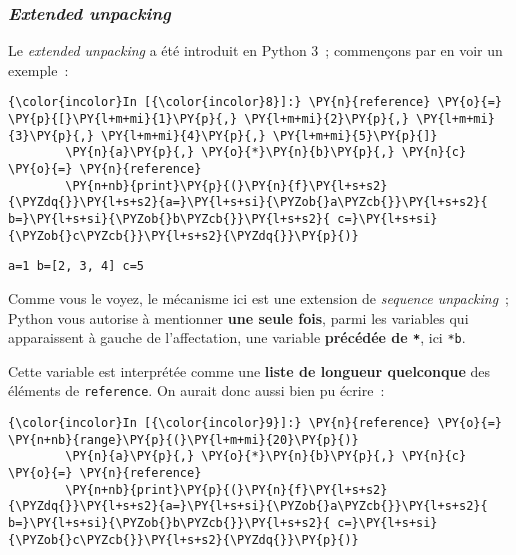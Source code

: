     \hypertarget{extended-unpacking}{%
\subsubsection{\texorpdfstring{\emph{Extended
unpacking}}{Extended unpacking}}\label{extended-unpacking}}

    Le \emph{extended unpacking} a été introduit en Python 3~; commençons
par en voir un exemple~:

    \begin{Verbatim}[commandchars=\\\{\},frame=single,framerule=0.3mm,rulecolor=\color{cellframecolor}]
{\color{incolor}In [{\color{incolor}8}]:} \PY{n}{reference} \PY{o}{=} \PY{p}{[}\PY{l+m+mi}{1}\PY{p}{,} \PY{l+m+mi}{2}\PY{p}{,} \PY{l+m+mi}{3}\PY{p}{,} \PY{l+m+mi}{4}\PY{p}{,} \PY{l+m+mi}{5}\PY{p}{]}
        \PY{n}{a}\PY{p}{,} \PY{o}{*}\PY{n}{b}\PY{p}{,} \PY{n}{c} \PY{o}{=} \PY{n}{reference}
        \PY{n+nb}{print}\PY{p}{(}\PY{n}{f}\PY{l+s+s2}{\PYZdq{}}\PY{l+s+s2}{a=}\PY{l+s+si}{\PYZob{}a\PYZcb{}}\PY{l+s+s2}{ b=}\PY{l+s+si}{\PYZob{}b\PYZcb{}}\PY{l+s+s2}{ c=}\PY{l+s+si}{\PYZob{}c\PYZcb{}}\PY{l+s+s2}{\PYZdq{}}\PY{p}{)}
\end{Verbatim}


    \begin{Verbatim}[commandchars=\\\{\},frame=single,framerule=0.3mm,rulecolor=\color{cellframecolor}]
a=1 b=[2, 3, 4] c=5
\end{Verbatim}

    Comme vous le voyez, le mécanisme ici est une extension de
\emph{sequence unpacking}~; Python vous autorise à mentionner
\textbf{une seule fois}, parmi les variables qui apparaissent à gauche
de l'affectation, une variable \textbf{précédée de \texttt{*}}, ici
\texttt{*b}.

Cette variable est interprétée comme une \textbf{liste de longueur
quelconque} des éléments de \texttt{reference}. On aurait donc aussi
bien pu écrire~:

    \begin{Verbatim}[commandchars=\\\{\},frame=single,framerule=0.3mm,rulecolor=\color{cellframecolor}]
{\color{incolor}In [{\color{incolor}9}]:} \PY{n}{reference} \PY{o}{=} \PY{n+nb}{range}\PY{p}{(}\PY{l+m+mi}{20}\PY{p}{)}
        \PY{n}{a}\PY{p}{,} \PY{o}{*}\PY{n}{b}\PY{p}{,} \PY{n}{c} \PY{o}{=} \PY{n}{reference}
        \PY{n+nb}{print}\PY{p}{(}\PY{n}{f}\PY{l+s+s2}{\PYZdq{}}\PY{l+s+s2}{a=}\PY{l+s+si}{\PYZob{}a\PYZcb{}}\PY{l+s+s2}{ b=}\PY{l+s+si}{\PYZob{}b\PYZcb{}}\PY{l+s+s2}{ c=}\PY{l+s+si}{\PYZob{}c\PYZcb{}}\PY{l+s+s2}{\PYZdq{}}\PY{p}{)}
\end{Verbatim}


